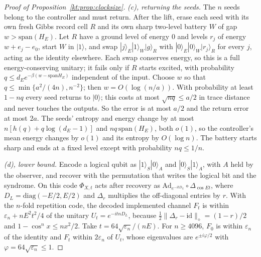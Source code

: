 \begin{proof}[Proof of Proposition~\ref{kt:prop:clocksize}]
\emph{(c), returning the seeds.} The $n$ seeds belong to the controller and must return. After the lift, erase each seed with its own fresh Gibbs record cell $R$ and its own sharp two-level battery $W$ of gap $w>\mathrm{span}(H_E)$. Let $R$ have a ground level of energy $0$ and levels $r_j$ of energy $w+e_j-e_0$, start $W$ in $|1\rangle$, and swap $|j\rangle_E|1\rangle_W|g\rangle_R$ with $|0\rangle_E|0\rangle_W|r_j\rangle_R$ for every $j$, acting as the identity elsewhere. Each swap conserves energy, so this is a full energy-conserving unitary; it fails only if $R$ starts excited, with probability $q\le d_Ee^{-\beta(w-\mathrm{span}H_E)}$ independent of the input. Choose $w$ so that $q\le\min\{a^2/(4n),n^{-2}\}$; then $w=O(\log(n/a))$. With probability at least $1-nq$ every seed returns to $|0\rangle$; this costs at most $\sqrt{nq}\le a/2$ in trace distance and never touches the outputs. So the error is at most $a/2$ and the return error at most $2a$. The seeds' entropy and energy change by at most $n[h(q)+q\log(d_E-1)]$ and $nq\,\mathrm{span}(H_E)$, both $o(1)$, so the controller's mean energy changes by $o(1)$ and its entropy by $O(\log n)$. The battery starts sharp and ends at a fixed level except with probability $nq\le1/n$.

\emph{(d), lower bound.} Encode a logical qubit as $|1\rangle_S|0\rangle_A$ and $|0\rangle_S|1\rangle_A$, with $A$ held by the observer, and recover with the permutation that writes the logical bit and the syndrome. On this code $\Phi_{X,t}$ acts after recovery as $\mathrm{Ad}_{e^{-itD_L}}\circ\Delta_{\cos Et}$, where $D_L=\mathrm{diag}(-E/2,E/2)$ and $\Delta_r$ multiplies the off-diagonal entries by $r$. With the $n$-fold repetition code, the decoded implemented channel $F_t$ is within $\varepsilon_n+nE^2t^2/4$ of the unitary $U_t=e^{-itnD_L}$, because $\frac12\|\Delta_r-\mathrm{id}\|_\diamond=(1-r)/2$ and $1-\cos^nx\le nx^2/2$. Take $t=64\sqrt{\varepsilon_n}/(nE)$. For $n\ge4096$, $F_0$ is within $\varepsilon_n$ of the identity and $F_t$ within $2\varepsilon_n$ of $U_t$, whose eigenvalues are $e^{\pm i\varphi/2}$ with $\varphi=64\sqrt{\varepsilon_n}\le1$.


\end{proof}
